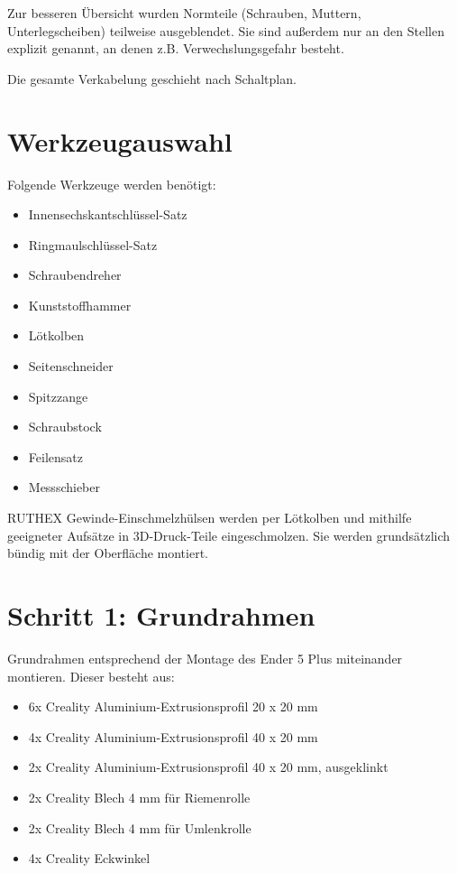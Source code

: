 Zur besseren Übersicht wurden Normteile (Schrauben, Muttern, Unterlegscheiben) teilweise ausgeblendet. Sie sind außerdem nur an den Stellen explizit genannt, an denen z.B. Verwechslungsgefahr besteht.

Die gesamte Verkabelung geschieht nach Schaltplan.

\section{Werkzeugauswahl}

Folgende Werkzeuge werden benötigt:

\begin{itemize}
	\item Innensechskantschlüssel-Satz
	\item Ringmaulschlüssel-Satz
	\item Schraubendreher
	\item Kunststoffhammer
	\item Lötkolben
	\item Seitenschneider
	\item Spitzzange
	\item Schraubstock
	\item Feilensatz
	\item Messschieber
\end{itemize}

RUTHEX Gewinde-Einschmelzhülsen werden per Lötkolben und mithilfe geeigneter Aufsätze in 3D-Druck-Teile eingeschmolzen. Sie werden grundsätzlich bündig mit der Oberfläche montiert.

\section{Schritt 1: Grundrahmen}

Grundrahmen entsprechend der Montage des Ender 5 Plus miteinander montieren. Dieser besteht aus:

\begin{itemize}
	\item 6x Creality Aluminium-Extrusionsprofil 20 x 20 mm
	\item 4x Creality Aluminium-Extrusionsprofil 40 x 20 mm
	\item 2x Creality Aluminium-Extrusionsprofil 40 x 20 mm, ausgeklinkt
	\item 2x Creality Blech 4 mm für Riemenrolle
	\item 2x Creality Blech 4 mm für Umlenkrolle
	\item 4x Creality Eckwinkel
\end{itemize}

